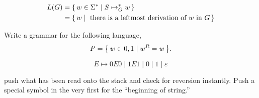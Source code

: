 \begin{definition}
    \begin{align*}
    L(G) &= { \left\{\, w \in \Sigma^* \mid S \mapsto_G^* w \,\right\} }   \\
         &= { \left\{\, w \mid \text{ there is a leftmost derivation of $w$ in $G$} \,\right\} }
    \end{align*}
\end{definition}

\begin{example}[Palindromes]
    Write a grammar for the following language,
    \[
        P = { \left\{\, w \in {0,1} \mid w^R = w \,\right\} }.
    \]

    \[
        E \mapsto 0E0 \mid 1E1 \mid 0 \mid 1 \mid \varepsilon
    \]
\end{example}

push what has been read onto the stack and check for reversion instantly.
Push a special symbol in the very first for the ``beginning of string.''
